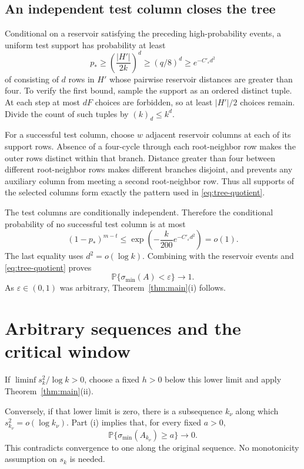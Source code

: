 \documentclass[11pt]{article}
\theoremstyle{definition}
\theoremstyle{remark}
\newcommand{\PP}{\mathbb P}
\newcommand{\smin}{\sigma_{\min}}
\newcommand{\abs}[1]{\left\lvert #1\right\rvert}
\begin{document}
\subsection{An independent test column closes the tree}

Conditional on a reservoir satisfying the preceding high-probability events, a uniform test support has probability at least
\begin{equation}\label{eq:root-success}
 p_*\geq\left(\frac{\abs{H'}}{2k}\right)^d
 \geq(q/8)^d
 \geq e^{-C'_{\varepsilon}d^2}
\end{equation}
of consisting of $d$ rows in $H'$ whose pairwise reservoir distances are greater than four. To verify the first bound, sample the support as an ordered distinct tuple. At each step at most $dF$ choices are forbidden, so at least $\abs{H'}/2$ choices remain. Divide the count of such tuples by $(k)_d\leq k^d$.

For a successful test column, choose $w$ adjacent reservoir columns at each of its support rows. Absence of a four-cycle through each root-neighbor row makes the outer rows distinct within that branch. Distance greater than four between different root-neighbor rows makes different branches disjoint, and prevents any auxiliary column from meeting a second root-neighbor row. Thus all supports of the selected columns form exactly the pattern used in \eqref{eq:tree-quotient}.

The test columns are conditionally independent. Therefore the conditional probability of no successful test column is at most
\[
 (1-p_*)^{m-t}\leq\exp\!\left(-\frac{k}{200}
                                  e^{-C'_\varepsilon d^2}\right)=o(1).
\]
The last equality uses $d^2=o(\log k)$. Combining with the reservoir events and \eqref{eq:tree-quotient} proves
\[
 \PP\{\smin(A)<\varepsilon\}\longrightarrow1.
\]
As $\varepsilon\in(0,1)$ was arbitrary, Theorem~\ref{thm:main}(i) follows.

\section{Arbitrary sequences and the critical window}\label{sec:sequences}

If $\liminf s_k^2/\log k>0$, choose a fixed $h>0$ below this lower limit and apply Theorem~\ref{thm:main}(ii).

Conversely, if that lower limit is zero, there is a subsequence $k_\nu$ along which $s_{k_\nu}^2=o(\log k_\nu)$. Part (i) implies that, for every fixed $a>0$,
\[
 \PP\{\smin(A_{k_\nu})\geq a\}\longrightarrow0.
\]
This contradicts convergence to one along the original sequence. No monotonicity assumption on $s_k$ is needed.
\end{document}
